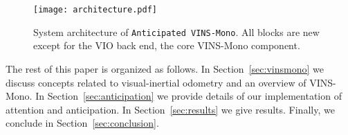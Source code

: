 \begin{figure}
\centering
\texttt{[image: architecture.pdf]} 
\caption{System architecture of \texttt{Anticipated VINS-Mono}. All blocks are new except for the VIO back end, the core VINS-Mono component.}
\label{fig:architecture} 
\end{figure}

The rest of this paper is organized as follows.
In Section~\ref{sec:vinsmono} we discuss concepts related to visual-inertial odometry and an overview of VINS-Mono.
In Section~\ref{sec:anticipation} we provide details of our implementation of attention and anticipation.
In Section~\ref{sec:results} we give results.
Finally, we conclude in Section~\ref{sec:conclusion}.
